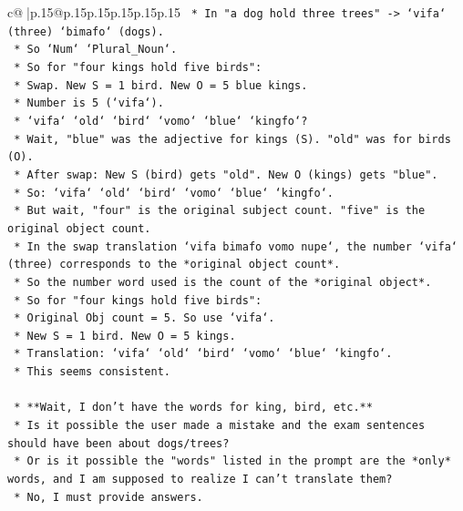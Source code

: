 \documentclass{article}
\begin{document}
{\begin{supertabular}{c@{$\;$}|p{.15\linewidth}@{}p{.15\linewidth}p{.15\linewidth}p{.15\linewidth}p{.15\linewidth}p{.15\linewidth}}
{{{\texttt{        *   In "a dog hold three trees" {-}> `vifa` (three) `bimafo` (dogs).} \\
\texttt{        *   So `Num` `Plural\_Noun`.} \\
\texttt{        *   So for "four kings hold five birds":} \\
\texttt{            *   Swap. New S = 1 bird. New O = 5 blue kings.} \\
\texttt{            *   Number is 5 (`vifa`).} \\
\texttt{            *   `vifa` `old` `bird` `vomo` `blue` `kingfo`?} \\
\texttt{            *   Wait, "blue" was the adjective for kings (S). "old" was for birds (O).} \\
\texttt{            *   After swap: New S (bird) gets "old". New O (kings) gets "blue".} \\
\texttt{            *   So: `vifa` `old` `bird` `vomo` `blue` `kingfo`.} \\
\texttt{            *   But wait, "four" is the original subject count. "five" is the original object count.} \\
\texttt{            *   In the swap translation `vifa bimafo vomo nupe`, the number `vifa` (three) corresponds to the *original object count*.} \\
\texttt{            *   So the number word used is the count of the *original object*.} \\
\texttt{            *   So for "four kings hold five birds":} \\
\texttt{                *   Original Obj count = 5. So use `vifa`.} \\
\texttt{                *   New S = 1 bird. New O = 5 kings.} \\
\texttt{                *   Translation: `vifa` `old` `bird` `vomo` `blue` `kingfo`.} \\
\texttt{    *   This seems consistent.} \\
\\ 
\texttt{    *   **Wait, I don't have the words for king, bird, etc.**} \\
\texttt{    *   Is it possible the user made a mistake and the exam sentences should have been about dogs/trees?} \\
\texttt{    *   Or is it possible the "words" listed in the prompt are the *only* words, and I am supposed to realize I can't translate them?} \\
\texttt{    *   No, I must provide answers.} \\
}}}
\end{supertabular}}
\end{document}
